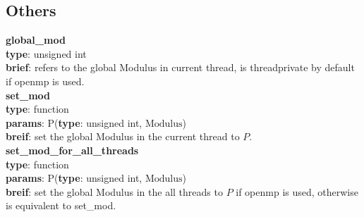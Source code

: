 \documentclass[8pt, a4paper, oneside, twocolumn]{article}
\begin{document}
\subsection{Others}
\textbf{global\_mod}\\
\indent\textbf{type}: unsigned int\\
\indent\textbf{brief}: refers to the global Modulus in current thread, is threadprivate by default if openmp is used.\\
\textbf{set\_mod}\\
\indent\textbf{type}: function\\
\indent\textbf{params}: P(\textbf{type}: unsigned int, $\mathrm{Modulus}$)\\
\indent\textbf{breif}: set the global Modulus in the current thread to $P$.\\
\textbf{set\_mod\_for\_all\_threads}\\
\indent\textbf{type}: function\\
\indent\textbf{params}: P(\textbf{type}: unsigned int, $\mathrm{Modulus}$)\\
\indent\textbf{breif}: set the global Modulus in the all threads to $P$ if openmp is used, otherwise is equivalent to set\_mod.\\
\end{document}

